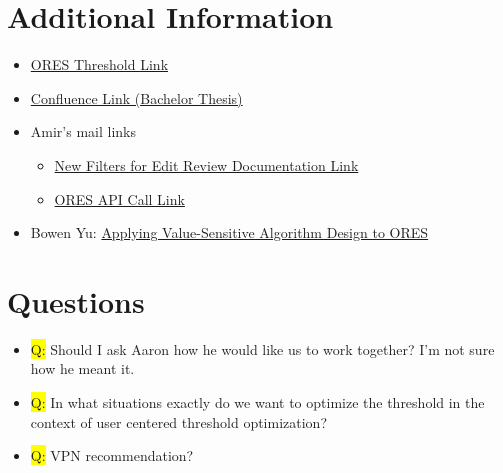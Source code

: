 \documentclass[12pt,a4paper]{article}
\begin{document}
\section*{Additional Information}
\begin{itemize}
\item \href{https://www.mediawiki.org/wiki/ORES/Thresholds}{ORES Threshold Link}
\item \href{https://intern.hcc.mi.fu-berlin.de/confluence/pages/viewpage.action?pageId=33269659}{Confluence Link (Bachelor Thesis)}
\item Amir's mail links
\begin{itemize}
\item \href{https://www.mediawiki.org/wiki/Help:New_filters_for_edit_review/Quality_and_Intent_Filters}{New Filters for Edit Review Documentation Link}
\item \href{https://ores.wikimedia.org/v3/scores/eswiki/?models=damaging&model_info=statistics.thresholds.false.%22maximum+recall+%40+precision+%3E%3D+0.995%22%7Cstatistics.thresholds.true.%22maximum+filter_rate+%40+recall+%3E%3D+0.9%22%7Cstatistics.thresholds.true.%22maximum+recall+%40+precision+%3E%3D+0.6%22%7Cstatistics.thresholds.true.%22maximum+recall+%40+precision+%3E%3D+0.9%22&format=json}{ORES API Call Link}
\end{itemize}
\item Bowen Yu: \href{https://meta.m.wikimedia.org/wiki/Research:Applying_Value-Sensitive_Algorithm_Design_to_ORES}{Applying Value-Sensitive Algorithm Design to ORES}
\end{itemize}
\section*{Questions}
\begin{itemize}
%
\item \colorbox{yellow}{Q:} Should I ask Aaron how he would like us to work together? I'm not sure how he meant it.
%
\item \colorbox{yellow}{Q:} In what situations exactly do we want to optimize the threshold in the context of user centered threshold optimization?
%
\item \colorbox{yellow}{Q:} VPN recommendation?
%
\end{itemize}
\end{document}
